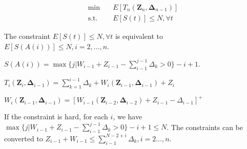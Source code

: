 \documentclass{article}
\newcommand{\Z}{\mathbf{Z}}
\newcommand{\D}{\bm{\Delta}}
\begin{document}
\begin{equation}\label{stochastic}
    \begin{aligned}
        \min \quad & E \left[T_n(\Z_{n}, \D_{n-1}) \right] \\
        \mbox{s.t.} \quad & E\left[S(t) \right] \leq N, \forall t
    \end{aligned}
\end{equation}

The constraint $E\left[S(t) \right] \leq N, \forall t$ is equivalent to $E\left[S(A(i)) \right] \leq N, i=2,\ldots, n$.

$S(A(i)) = \max\{j|W_{i-1} + Z_{i-1}-\sum_{i-1}^{j-1} \Delta_{k} >0\} - i + 1$.


$T_{i}(\Z_{i}, \D_{i-1}) = \sum_{k=1}^{i-1} \Delta_{k} + W_{i}(\Z_{i-1}, \D_{i-1}) + Z_{i}$


$W_{i}(\Z_{i-1}, \D_{i-1}) = [W_{i-1}(\Z_{i-2}, \D_{i-2}) + Z_{i-1} - \Delta_{i-1}]^{+}$


If the constraint is hard, for each $i$, we have $\max\{j|W_{i-1} + Z_{i-1}-\sum_{i-1}^{j-1} \Delta_{k} >0\} - i + 1 \leq N$. The constraints can be converted to $Z_{i-1} + W_{i-1} \leq \sum_{i-1}^{N-2+i} \Delta_{k}, i =2 \ldots, n$.





\end{document}

